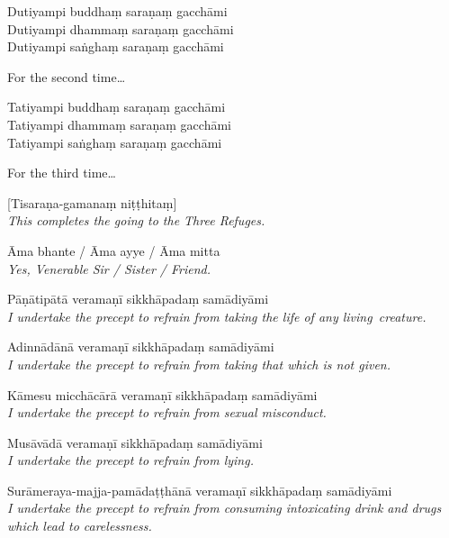 \clearpage

Dutiyampi buddhaṃ saraṇaṃ gacchāmi\\
Dutiyampi dhammaṃ saraṇaṃ gacchāmi\\
Dutiyampi saṅghaṃ saraṇaṃ gacchāmi

\begin{english}
  For the second time\ldots
\end{english}

Tatiyampi buddhaṃ saraṇaṃ gacchāmi\\
Tatiyampi dhammaṃ saraṇaṃ gacchāmi\\
Tatiyampi saṅghaṃ saraṇaṃ gacchāmi

\begin{english}
  For the third time\ldots
\end{english}


[Tisaraṇa-gamanaṃ niṭṭhitaṃ]\\
\emph{This completes the going to the Three Refuges.}


Āma bhante / Āma ayye / Āma mitta\\
\emph{Yes, Venerable Sir / Sister / Friend.}


\enlargethispage{-\baselineskip}

{\raggedright

\begin{packedenumerate}
  \item Pāṇātipātā veramaṇī sikkhāpadaṃ samādiyāmi\\
    \emph{I undertake the precept to refrain from taking the life of any living~creature.}
  \item Adinnādānā veramaṇī sikkhāpadaṃ samādiyāmi\\
    \emph{I undertake the precept to refrain from taking that which is not given.}
  \item Kāmesu micchācārā veramaṇī sikkhāpadaṃ samādiyāmi\\
    \emph{I undertake the precept to refrain from sexual misconduct.}
  \item Musāvādā veramaṇī sikkhāpadaṃ samādiyāmi\\
    \emph{I undertake the precept to refrain from lying.}
  \item Surāmeraya-majja-pamādaṭṭhānā veramaṇī sikkhāpadaṃ samādiyāmi\\
    \emph{I undertake the precept to refrain from consuming intoxicating drink and drugs which lead to carelessness.}
\end{packedenumerate}

}

